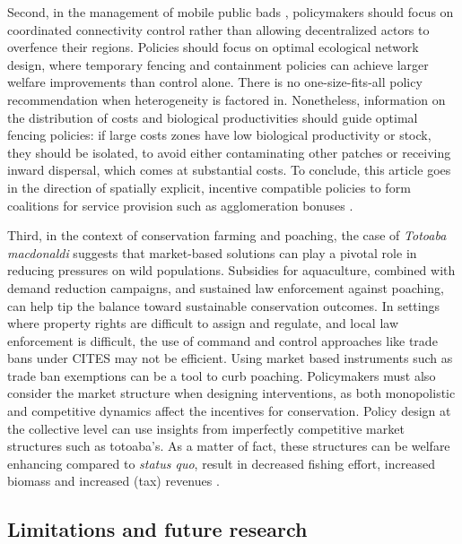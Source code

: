 Second, in the management of mobile public bads \citep{costello_private_2017}, policymakers should focus on coordinated connectivity control rather than allowing decentralized actors to overfence their regions. Policies should focus on optimal ecological network design, where temporary fencing and containment policies can achieve larger welfare improvements than control alone. There is no one-size-fits-all policy recommendation when heterogeneity is factored in. Nonetheless, information on the distribution of costs and biological productivities should guide optimal fencing policies: if large costs zones have low biological productivity or stock, they should be isolated, to avoid either contaminating other patches or receiving inward dispersal, which comes at substantial costs. To conclude, this article goes in the direction of spatially explicit, incentive compatible policies to form coalitions for service provision such as agglomeration bonuses \citep{parkhurst2002agglomeration, bareille_agglomeration_2023}. 

Third, in the context of conservation farming and poaching, the case of \textit{Totoaba macdonaldi} suggests that market-based solutions can play a pivotal role in reducing pressures on wild populations. Subsidies for aquaculture, combined with demand reduction campaigns, and sustained law enforcement against poaching, can help tip the balance toward sustainable conservation outcomes. In settings where property rights are difficult to assign and regulate, and local law enforcement is difficult, the use of command and control approaches like trade bans under CITES may not be efficient. Using market based instruments such as trade ban exemptions can be a tool to curb poaching. 
Policymakers must also consider the market structure when designing interventions, as both monopolistic and competitive dynamics affect the incentives for conservation. Policy design at the collective level can use insights from imperfectly competitive market structures such as totoaba's. As a matter of fact, these structures can be welfare enhancing compared to \textit{status quo}, result in decreased fishing effort, increased biomass and increased (tax) revenues \citep{englander_fish_2023}.

{}
\subsection*{Limitations and future research}

